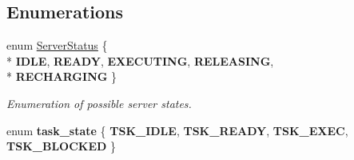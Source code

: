 \subsection*{Enumerations}
\begin{DoxyCompactItemize}
\item 
enum \hyperlink{namespaceRTSim_a7b8699b4614a115fd4b5bedf6335ff7b}{Server\+Status} \{ \\*
{\bfseries I\+D\+LE}, 
{\bfseries R\+E\+A\+DY}, 
{\bfseries E\+X\+E\+C\+U\+T\+I\+NG}, 
{\bfseries R\+E\+L\+E\+A\+S\+I\+NG}, 
\\*
{\bfseries R\+E\+C\+H\+A\+R\+G\+I\+NG}
 \}\hypertarget{namespaceRTSim_a7b8699b4614a115fd4b5bedf6335ff7b}{}\label{namespaceRTSim_a7b8699b4614a115fd4b5bedf6335ff7b}
\begin{DoxyCompactList}\small\item\em Enumeration of possible server states. \end{DoxyCompactList}
\item 
enum {\bfseries task\+\_\+state} \{ {\bfseries T\+S\+K\+\_\+\+I\+D\+LE}, 
{\bfseries T\+S\+K\+\_\+\+R\+E\+A\+DY}, 
{\bfseries T\+S\+K\+\_\+\+E\+X\+EC}, 
{\bfseries T\+S\+K\+\_\+\+B\+L\+O\+C\+K\+ED}
 \}\hypertarget{namespaceRTSim_aec47eb36f03d8ca985dc01ae1cfd43b0}{}\label{namespaceRTSim_aec47eb36f03d8ca985dc01ae1cfd43b0}

\end{DoxyCompactItemize}

